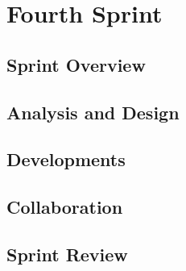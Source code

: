 \chapter{Fourth Sprint}

\section{Sprint Overview}


\section{Analysis and Design}

\section{Developments}

\section{Collaboration}

\section{Sprint Review}
